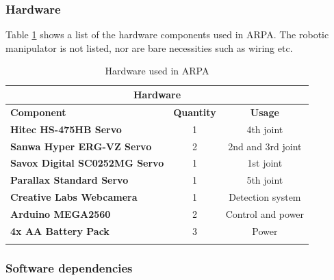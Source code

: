 \documentclass[11pt,a4paper, titlepage]{article}
\begin{document}
\subsubsection{Hardware}

Table \ref{hardware} shows a list of the hardware components used in ARPA. The robotic manipulator is not listed, nor are bare necessities such as wiring etc.

	\begin{center}           
    \begin{longtable}{| l | c | c |}
              \hline
\multicolumn{3}{|c|}{\textbf{Hardware}} \\ \hline \endhead
\textbf{Component} & \textbf{Quantity} & \textbf{Usage} \\ \hline             
              \textbf{Hitec HS-475HB Servo} &  1 & 4th joint \\ \hline
              
              \textbf{Sanwa Hyper ERG-VZ Servo} &  2 & 2nd and 3rd joint \\ \hline
             
              \textbf{Savox Digital SC0252MG Servo} & 1 & 1st joint \\ \hline
              
              \textbf{Parallax Standard Servo} & 1 & 5th joint \\ \hline
              
              \textbf{Creative Labs Webcamera} & 1 & Detection system  \\  \hline
              
              \textbf{Arduino MEGA2560} & 2 & Control and power  \\ \hline
              
              \textbf{4x AA Battery Pack} & 3 & Power   \\  \hline

\caption{Hardware used in ARPA}
\label{hardware}                                       
\end{longtable}
\end{center}



\subsubsection{Software dependencies}
\end{document}
